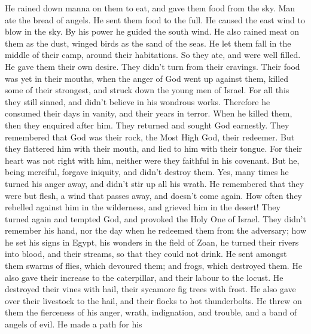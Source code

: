  He rained down manna on them to eat, and gave them food
from the sky.  Man ate the bread of angels. He sent them
food to the full.  He caused the east wind to blow in the
sky. By his power he guided the south wind.  He also
rained meat on them as the dust, winged birds as the sand of the seas.
 He let them fall in the middle of their camp, around
their habitations.  So they ate, and were well filled. He
gave them their own desire.  They didn't turn from their
cravings. Their food was yet in their mouths,  when the
anger of God went up against them, killed some of their strongest, and
struck down the young men of Israel.  For all this they
still sinned, and didn't believe in his wondrous works. 
Therefore he consumed their days in vanity, and their years in terror.
 When he killed them, then they enquired after him. They
returned and sought God earnestly.  They remembered that
God was their rock, the Most High God, their redeemer. 
But they flattered him with their mouth, and lied to him with their
tongue.  For their heart was not right with him, neither
were they faithful in his covenant.  But he, being
merciful, forgave iniquity, and didn't destroy them. Yes, many times he
turned his anger away, and didn't stir up all his wrath. 
He remembered that they were but flesh, a wind that passes away, and
doesn't come again.  How often they rebelled against him
in the wilderness, and grieved him in the desert!  They
turned again and tempted God, and provoked the Holy One of Israel.
 They didn't remember his hand, nor the day when he
redeemed them from the adversary;  how he set his signs
in Egypt, his wonders in the field of Zoan,  he turned
their rivers into blood, and their streams, so that they could not
drink.  He sent amongst them swarms of flies, which
devoured them; and frogs, which destroyed them.  He also
gave their increase to the caterpillar, and their labour to the locust.
 He destroyed their vines with hail, their sycamore fig
trees with frost.  He also gave over their livestock to
the hail, and their flocks to hot thunderbolts.  He threw
on them the fierceness of his anger, wrath, indignation, and trouble,
and a band of angels of evil.  He made a path for his
